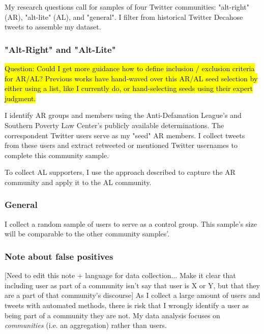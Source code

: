 \documentclass[acmlarge, screen, authorversion]{acmart}
\begin{document}
My research questions call for samples of four Twitter communities: "alt-right" (AR), "alt-lite" (AL), and "general". I filter from historical Twitter Decahose tweets to assemble my dataset.


    \subsubsection{"Alt-Right" and "Alt-Lite"}
    
    \hl{Question: Could I get more guidance how to define inclusion / exclusion criteria for AR/AL? Previous works have hand-waved over this AR/AL seed selection by either using a list, like I currently do, or hand-selecting seeds using their expert judgment.}

    I identify AR groups and members using the Anti-Defamation League's \cite{anti-defamationleagueAltRightAlt} and Southern Poverty Law Center's \cite{southernpovertylawcenterAltRight} publicly available determinations. The correspondent Twitter users serve as my "seed" AR members. I collect tweets from these users and extract retweeted or mentioned Twitter usernames to complete this community sample.
    
    To collect AL supporters, I use the approach described to capture the AR community and apply it to the AL community.
    
    \subsubsection{General}
    
    I collect a random sample of users to serve as a control group. This sample's size will be comparable to the other community samples'.
    
    
    
    \subsubsection{Note about false positives} [Need to edit this note + language for data collection... Make it clear that including user as part of a community isn't say that user is X or Y, but that they are a part of that community's discourse]  As I collect a large amount of users and tweets with automated methods, there is risk that I wrongly identify a user as being part of a community they are not. My data analysis focuses on \textit{communities} (i.e. an aggregation) rather than users. 
    
\end{document}
